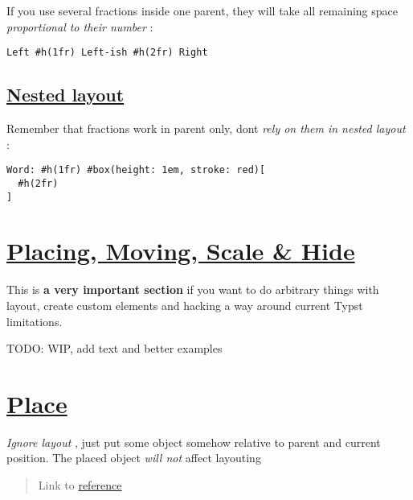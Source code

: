 If you use several fractions inside one parent, they will take all
remaining space \emph{proportional to their number} :

\begin{verbatim}
Left #h(1fr) Left-ish #h(2fr) Right
\end{verbatim}

\pandocbounded{}

\subsection{\texorpdfstring{\hyperref[nested-layout]{Nested
layout}}{Nested layout}}\label{nested-layout}

Remember that fractions work in parent only, don\textquotesingle t
\emph{rely on them in nested layout} :

\begin{verbatim}
Word: #h(1fr) #box(height: 1em, stroke: red)[
  #h(2fr)
]
\end{verbatim}

\pandocbounded{}

\section{\texorpdfstring{\hyperref[placing-moving-scale--hide]{Placing,
Moving, Scale \&
Hide}}{Placing, Moving, Scale \& Hide}}\label{placing-moving-scale--hide}

This is \textbf{a very important section} if you want to do arbitrary
things with layout, create custom elements and hacking a way around
current Typst limitations.

TODO: WIP, add text and better examples

\section{\texorpdfstring{\hyperref[place]{Place}}{Place}}\label{place}

\emph{Ignore layout} , just put some object somehow relative to parent
and current position. The placed object \emph{will not} affect layouting

\begin{quote}
Link to \href{https://typst.app/docs/reference/layout/place/}{reference}
\end{quote}

